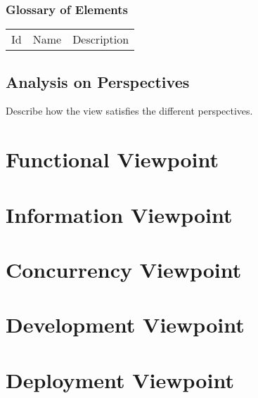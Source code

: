 \documentclass{article}
\begin{document}
\subsubsection*{Glossary of Elements}
\begin{longtable}{lll}
Id & Name & Description \\
\end{longtable}

\subsection*{Analysis on Perspectives}
Describe how the view satisfies the different perspectives. 

\section*{Functional Viewpoint}

\section*{Information Viewpoint}

\section*{Concurrency Viewpoint}

\section*{Development Viewpoint}

\section*{Deployment Viewpoint}
\end{document}
